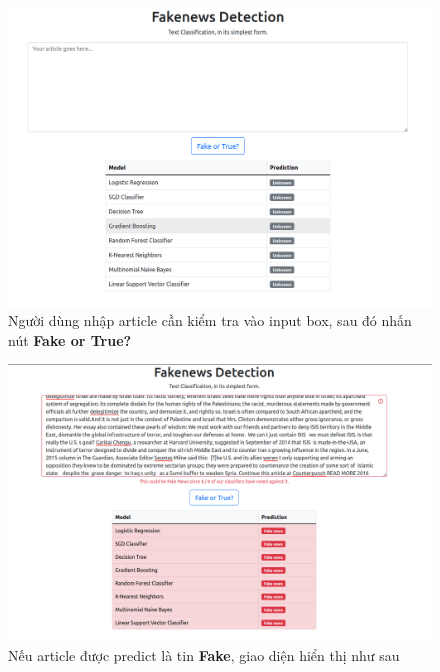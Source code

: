 \documentclass[12pt]{article}
\begin{document}
\begin{figure}[H]
\centering
\includegraphics[scale=.25]{img/homepage.png}
\caption{Người dùng nhập article cần kiểm tra vào input box, sau đó nhấn nút \textbf{Fake or True?}}
\label{fig:homepage}
\end{figure}

\begin{figure}[H]
\centering
\includegraphics[scale=.25]{img/fake-result.png}
\caption{Nếu article được predict là tin \textbf{Fake}, giao diện hiển thị như sau}
\label{fig:fake-result}
\end{figure}
\end{document}
